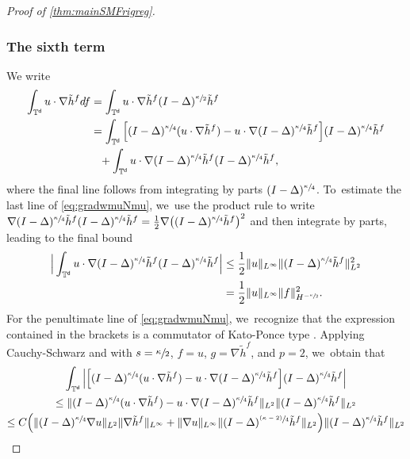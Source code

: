 \documentclass[JEP,XML,SOM,Unicode,published]{cedram}
\newcommand{\psfrac}[2]{\sfrac{(#1)}{#2}}
\theoremstyle{plain}
\theoremstyle{definition}
\let\div\relax
\DeclareMathOperator{\div}{\mathrm{div}}
\newcommand{\T}{{\mathbb{T}}}
\let\ka\kappa
\let\nab\nabla
\let\tl\tilde
\newcommand{\ph}{\phantom{=}}
\renewcommand{\d}{\mathsf{d}}
\begin{document}
\begin{proof}[Proof of \cref{thm:mainSMFrigreg}]
\subsubsection*{The sixth term} We write
\begin{equation}\label{eq:gradwmuNmu}
\begin{aligned}
\int_{\T^\d}u\cdot \nab \tl{h}^f df &= \int_{\T^\d}u\cdot \nab\tl{h}^{f} (I-\Delta)^{\sfrac{\ka}{2}}\tl{h}^{f}\\
&=\int_{\T^\d}\Big[(I-\Delta)^{\sfrac{\ka}{4}}(u\cdot\nab\tl{h}^{f}) - u\cdot\nab(I-\Delta)^{\sfrac{\ka}{4}}\tl{h}^{f}\Big](I-\Delta)^{\sfrac{\ka}{4}}\tl{h}^{f}\\
&\ph + \int_{\T^\d}u\cdot\nab(I-\Delta)^{\sfrac{\ka}{4}}\tl{h}^{f} (I-\Delta)^{\sfrac{\ka}{4}}\tl{h}^{f},
\end{aligned}
\end{equation}
where the final line follows from integrating by parts $(I-\Delta)^{\sfrac{\ka}{4}}$. To~estimate the last line of \eqref{eq:gradwmuNmu}, we~use the product rule to write $\nab(I-\Delta)^{\sfrac{\ka}{4}}\tl{h}^{f} (I-\Delta)^{\sfrac{\ka}{4}}\tl{h}^{f} = \frac12\nab\big((I-\Delta)^{\sfrac{\ka}{4}}\tl{h}^{f}\big)^2$ and then integrate by parts, leading to the final bound
\begin{equation}
\begin{aligned}\label{eq:gradwmuNmu1}
\Big|\int_{\T^\d}u\cdot\nab(I-\Delta)^{\sfrac{\ka}{4}}\tl{h}^{f} (I-\Delta)^{\sfrac{\ka}{4}}\tl{h}^{f}\Big| &\le \frac12\|\div u\|_{L^\infty} \|(I-\Delta)^{\sfrac{\ka}{4}}\tl{h}^{f}\|_{L^2}^2\\
&= \frac12\|\div u\|_{L^\infty} \|f\|_{H^{-\sfrac\ka2}}^2.
\end{aligned}
\end{equation}
For the penultimate line of \eqref{eq:gradwmuNmu}, we~recognize that the expression contained in the brackets is a commutator of Kato-Ponce type \cite{KP1988}. Applying Cauchy-Schwarz and \cite[Th.\,1.1]{Li2019} with $s=\sfrac{\ka}{2}$, $f= u$, $g=\nab\tl{h}^{f}$, and $p=2$, we~obtain that
\begin{multline}\label{eq:gradwmuNmu2}
\int_{\T^\d}\Big|\Big[(I-\Delta)^{\sfrac{\ka}{4}}(u\cdot\nab\tl{h}^f) - u\cdot\nab(I-\Delta)^{\sfrac{\ka}{4}}\tl{h}^{f}\Big](I-\Delta)^{\sfrac{\ka}{4}}\tl{h}^{f}\Big|\\
\le \|(I-\Delta)^{\sfrac{\ka}{4}}(u\cdot\nab\tl{h}^{f}) - u\cdot\nab(I-\Delta)^{\sfrac{\ka}{4}}\tl{h}^{f}\|_{L^2}\|(I-\Delta)^{\sfrac{\ka}{4}}\tl{h}^{f}\|_{L^2}\\
\le C\Big(\|(I-\Delta)^{\sfrac{\ka}{4}}\nab u\|_{L^2} \|\nab\tl{h}^{f}\|_{L^\infty} + \|\nab u\|_{L^\infty}\|(I-\Delta)^{\psfrac{\ka-2}{4}}\tl{h}^{f}\|_{L^2} \Big)\|(I-\Delta)^{\sfrac{\ka}{4}}\tl{h}^{f}\|_{L^2}\\

\end{multline}
\end{proof}
\end{document}
